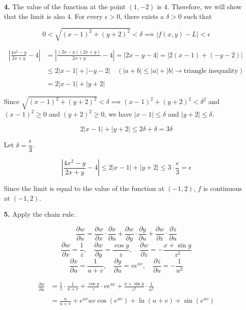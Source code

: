 \documentclass{article}
\begin{document}
\textbf{4.} The value of the function at the point $(1,-2)$ is $4$. Therefore, we will show that the limit is also $4$. For every $\epsilon>0$, there exists a $\delta>0$ such that

\[0<\sqrt{(x-1)^2+(y+2)^2}<\delta\implies\left|f(x,y)-L\right|<\epsilon\]

\begin{align*}\left|\frac{4x^2-y}{2x+y}-4\right|&=\left|\frac{(2x-y)(2x+y)}{2x+y}-4\right|=\left|2x-y-4\right|=\left|2(x-1)+(-y-2)\right|\\\\&\leq2|x-1|+\left|-y-2\right|\quad \left(|a+b|\leq|a|+|b|\rightarrow\text{triangle inequality}\right)\\\\&=2|x-1|+|y+2|\end{align*}

Since $\sqrt{(x-1)^2+(y+2)^2}<\delta\implies(x-1)^2+(y+2)^2<\delta^2$ and $(x-1)^2\geq0$ and $(y+2)^2\geq0$, we have $|x-1|\leq\delta$ and $|y+2|\leq\delta$.

\[2|x-1|+|y+2|\leq2\delta+\delta=3\delta\]

Let $\delta=\dfrac\epsilon3$.

\[\left|\frac{4x^2-y}{2x+y}-4\right|\leq2|x-1|+|y+2|\leq3\cdot\frac\epsilon3=\epsilon\]

Since the limit is equal to the value of the function at $(-1,2)$, $f$ is continuous at $(-1,2)$.

\vspace{1em}

\textbf{5.} Apply the chain rule.

\[\frac{\partial w}{\partial u}=\frac{\partial w}{\partial x}\cdot\frac{\partial x}{\partial u}+\frac{\partial w}{\partial y}\cdot\frac{\partial y}{\partial u}+\frac{\partial w}{\partial z}\cdot\frac{\partial z}{\partial u}\]
\[\frac{\partial w}{\partial x}=\frac1z,\quad\frac{\partial w}{\partial y}=\frac{\cos y}z,\quad \frac{\partial w}{\partial z}=-\frac{x+\sin y}{z^2}\]
\[\frac{\partial x}{\partial u}=\frac1{u+v},\quad\frac{\partial y}{\partial u}=v{e}^{uv},\quad\frac{\partial z}{\partial u}=-\frac1{u^2}\]

\begin{align*}\frac{\partial w}{\partial u}&=\frac1z\cdot\frac1{u+v}+\frac{\cos y}z\cdot v{e}^{uv}+\frac{x+\sin y}{z^2}\cdot\frac1{u^2}\\\\&=\boxed{\frac u{u+v}+{e}^{uv}uv\cos\left({e}^{uv}\right)+\ln(u+v)+\sin\left({e}^{uv}\right)}\end{align*}
\end{document}
